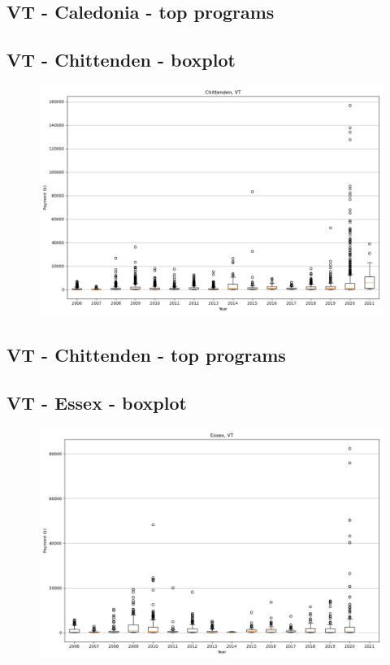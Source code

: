 \subsection*{VT - Caledonia - top programs}

\newpage
\subsection*{VT - Chittenden - boxplot}
\begin{figure}[h]
\centering
\includegraphics[width=7in]{../output/boxplots/counties/Chittenden-VT_boxplot.png}
\end{figure}


\subsection*{VT - Chittenden - top programs}

\newpage
\subsection*{VT - Essex - boxplot}
\begin{figure}[h]
\centering
\includegraphics[width=7in]{../output/boxplots/counties/Essex-VT_boxplot.png}
\end{figure}


